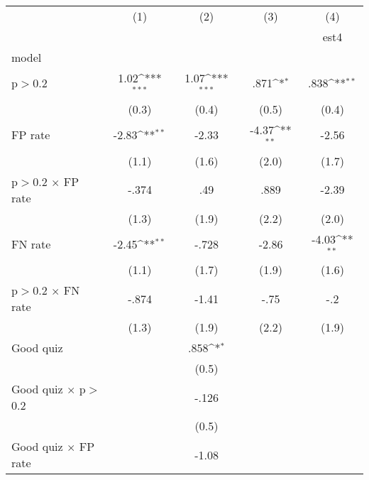 {
\def\sym#1{\ifmmode^{#1}\else\(^{#1}\)\fi}
\begin{tabular}{l*{4}{c}}
\hline\hline
                &\multicolumn{1}{c}{(1)}&\multicolumn{1}{c}{(2)}&\multicolumn{1}{c}{(3)}&\multicolumn{1}{c}{(4)}\\
                &\multicolumn{1}{c}{}&\multicolumn{1}{c}{}&\multicolumn{1}{c}{}&\multicolumn{1}{c}{est4}\\
\hline
model           &                  &                  &                  &                  \\
p$>$0.2         &     1.02\sym{***}&     1.07\sym{***}&     .871\sym{*}  &     .838\sym{**} \\
                &    (0.3)         &    (0.4)         &    (0.5)         &    (0.4)         \\
FP rate         &    -2.83\sym{**} &    -2.33         &    -4.37\sym{**} &    -2.56         \\
                &    (1.1)         &    (1.6)         &    (2.0)         &    (1.7)         \\
p$>$0.2 $\times$ FP rate&    -.374         &      .49         &     .889         &    -2.39         \\
                &    (1.3)         &    (1.9)         &    (2.2)         &    (2.0)         \\
FN rate         &    -2.45\sym{**} &    -.728         &    -2.86         &    -4.03\sym{**} \\
                &    (1.1)         &    (1.7)         &    (1.9)         &    (1.6)         \\
p$>$0.2 $\times$ FN rate&    -.874         &    -1.41         &     -.75         &      -.2         \\
                &    (1.3)         &    (1.9)         &    (2.2)         &    (1.9)         \\
Good quiz       &                  &     .858\sym{*}  &                  &                  \\
                &                  &    (0.5)         &                  &                  \\
Good quiz $\times$ p$>$0.2&                  &    -.126         &                  &                  \\
                &                  &    (0.5)         &                  &                  \\
Good quiz $\times$ FP rate&                  &    -1.08         &                  &                  \\

\end{tabular}}
